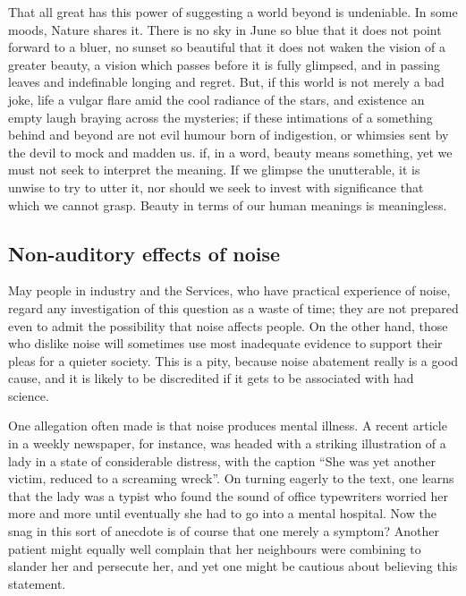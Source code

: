 \documentclass[11pt]{article}
\begin{document}
That all great has this power of suggesting a world beyond is undeniable. In some moods, Nature shares it. There is no sky in June so blue that it does not point forward to a bluer, no sunset so beautiful that it does not waken the vision of a greater beauty, a vision which passes before it is fully glimpsed, and in passing leaves and indefinable longing and regret. But, if this world is not merely a bad joke, life a vulgar flare amid the cool radiance of the stars, and existence an empty laugh braying across the mysteries; if these intimations of a something behind and beyond are not evil humour born of indigestion, or whimsies sent by the devil to mock and madden us. if, in a word, beauty means something, yet we must not seek to interpret the meaning. If we glimpse the unutterable, it is unwise to try to utter it, nor should we seek to invest with significance that which we cannot grasp. Beauty in terms of our human meanings is meaningless.
\subsection{Non-auditory effects of noise}
\label{sec-2-25}

May people in industry and the Services, who have practical experience of noise, regard any investigation of this question as a waste of time; they are not prepared even to admit the possibility that noise affects people. On the other hand, those who dislike noise will sometimes use most inadequate evidence to support their pleas for a quieter society. This is a pity, because noise abatement really is a good cause, and it is likely to be discredited if it gets to be associated with had science.

One allegation often made is that noise produces mental illness. A recent article in a weekly newspaper, for instance, was headed with a striking illustration of a lady in a state of considerable distress, with the caption ``She was yet another victim, reduced to a screaming wreck''. On turning eagerly to the text, one learns that the lady was a typist who found the sound of office typewriters worried her more and more until eventually she had to go into a mental hospital. Now the snag in this sort of anecdote is of course that one merely a symptom? Another patient might equally well complain that her neighbours were combining to slander her and persecute her, and yet one might be cautious about believing this statement.
\end{document}
